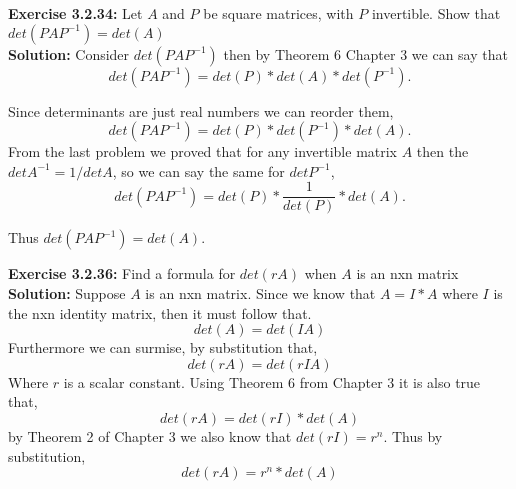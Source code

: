 \documentclass{amsart}
\begin{document}
\noindent\textbf{Exercise 3.2.34: } Let $A$ and $P$ be square matrices, with $P$ invertible. Show that $det(PAP^{-1}) = det(A)$\\
\noindent \textbf{Solution: } Consider $det(PAP^{-1})$ then by Theorem 6 Chapter 3 we can say that
 \begin{equation*}
 det(PAP^{-1}) = det(P)*det(A)*det(P^{-1}).
\end{equation*}
 
  Since determinants are just real numbers we can reorder them, 
   \begin{equation*}
  det(PAP^{-1}) = det(P)*det(P^{-1})*det(A).
\end{equation*}
 From the last problem we proved that for any invertible matrix $A$ then the $det A^{-1}  = 1/det A$, so we can say the same for $det P^{-1}$,
    \begin{equation*}
   det(PAP^{-1}) = det(P)*\frac{1}{det(P)}*det(A). 
\end{equation*}

   Thus $det(PAP^{-1}) = det(A)$.
\vspace{1in}

\noindent\textbf{Exercise 3.2.36: } Find a formula for $det(rA)$ when $A$ is an nxn matrix\\
\noindent \textbf{Solution: } Suppose $A$ is an nxn matrix. Since we know that $A = I*A$ where $I$ is the nxn identity matrix, then it must follow that.
\begin{equation*}
det(A) = det(IA)
\end{equation*}
Furthermore we can surmise, by substitution that,
\begin{equation*}
det(rA) = det(rIA)
\end{equation*}
Where $r$ is a scalar constant. Using Theorem 6 from Chapter 3 it is also true that,
\begin{equation*}
det(rA) = det(rI)*det(A)
\end{equation*}
by Theorem 2 of Chapter 3  we also know that $det(rI) = r^n$. Thus by substitution,
\begin{equation*}
det(rA) = r^n*det(A)
\end{equation*}
\vspace{1in}
\end{document}
